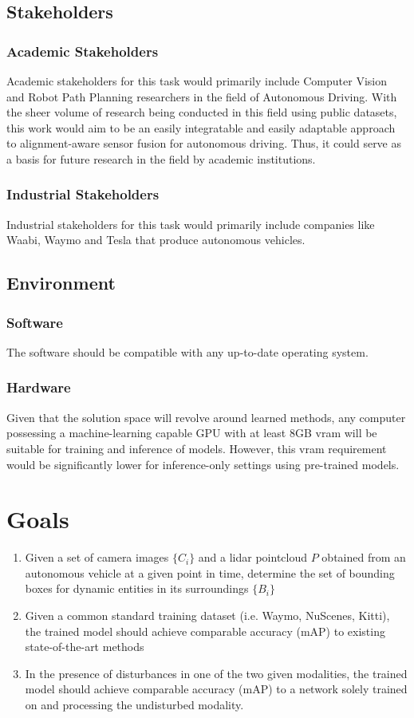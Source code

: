 \documentclass{article}
\begin{document}
\subsection{Stakeholders}
\subsubsection{Academic Stakeholders}
Academic stakeholders for this task would primarily include Computer Vision and Robot Path Planning researchers
in the field of Autonomous Driving. With the sheer volume of research being conducted in this field using public datasets,
this work would aim to be an easily integratable and easily adaptable approach to alignment-aware sensor fusion for autonomous
driving. Thus, it could serve as a basis for future research in the field by academic institutions. 

\subsubsection{Industrial Stakeholders}
Industrial stakeholders for this task would primarily include companies like Waabi, Waymo and Tesla that produce
autonomous vehicles. 

\subsection{Environment}
\subsubsection{Software}
The software should be compatible with any up-to-date operating system.

\subsubsection{Hardware}
Given that the solution space will revolve around learned methods, any computer possessing a machine-learning capable
GPU with at least 8GB vram will be suitable for training and inference of models. However, this vram requirement would
be significantly lower for inference-only settings using pre-trained models.

\section{Goals}
\begin{enumerate}
    \item Given a set of camera images $\{C_i\}$ and a lidar pointcloud $P$ obtained from an autonomous vehicle at a 
    given point in time, determine the set of bounding boxes for dynamic entities in its surroundings $\{B_i\}$ 
    \item Given a common standard training dataset (i.e. Waymo, NuScenes, Kitti), the trained model should achieve comparable 
    accuracy (mAP) to existing state-of-the-art methods
    \item In the presence of disturbances in one of the two given modalities, the trained model should achieve comparable 
    accuracy (mAP) to a network solely trained on and processing the undisturbed modality.
\end{enumerate}
\end{document}
